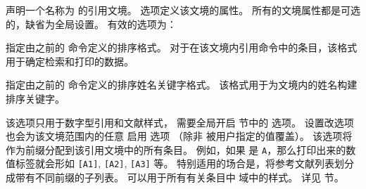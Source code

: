 \begin{ltxsyntax}


声明一个名称为  的引用文境。
 选项定义该文境的属性。
所有的文境属性都是可选的，缺省为全局设置。
有效的选项为：

\begin{optionlist*}


指定由之前的  命令定义的排序格式。
对于在该文境内引用命令中的条目，该格式用于确定检索和打印的数据。


指定由之前的  命令定义的排序姓名关键字格式。
该格式用于为文境内的姓名构建排序关键字。



该选项只用于数字型引用和文献样式，
需要全局开启  节中的  选项。
设置改选项也会为该文境范围内的任意  启用  选项
（除非  被用户指定的值覆盖）。
该选项将  作为前缀分配到该引用文境中的所有条目。
例如，如果  是 \texttt{A}，那么打印出来的数值标签就会形如 \texttt{[A1]}, \texttt{[A2]}, \texttt{[A3]} 等。
特别适用的场合是，将参考文献列表划分成带有不同前缀的子列表。
 可以用于所有有关条目中  域中的样式。
详见  节。


\end{optionlist*}
\end{ltxsyntax}
